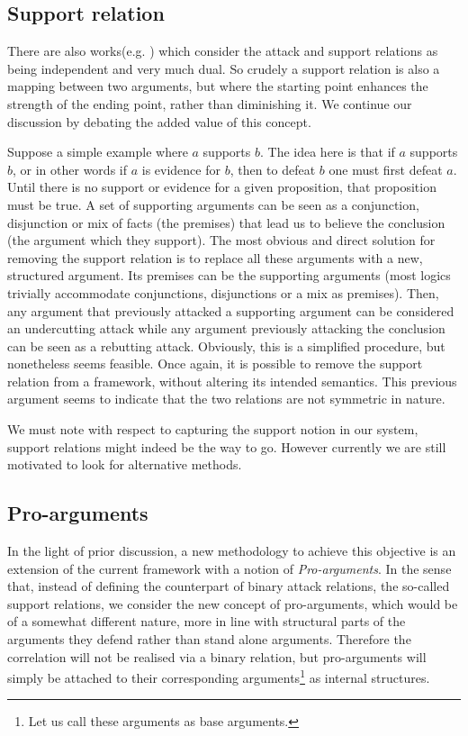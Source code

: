 \documentclass{article}
\begin{document}
\subsection{Support relation}
There are also works(e.g. \cite{4}) which consider the attack and support relations as being independent and very much dual. So crudely a support relation is also a mapping between two arguments, but where the starting point enhances the strength of the ending point, rather than diminishing it. We continue our discussion by debating the added value of this concept. 

 Suppose a simple example where $a$ supports $b$. The idea here is that if $a$ supports $b$, or in other words if $a$ is evidence for $b$, then to defeat $b$ one must first defeat $a$. Until there is no support or evidence for a given proposition, that proposition must be true. A set of supporting arguments can be seen as a conjunction, disjunction or mix of facts (the premises) that lead us to believe the conclusion (the argument which they support). The most obvious and direct solution for removing the support relation is to replace all these arguments with a new, structured argument. Its premises can be the supporting arguments (most logics trivially accommodate conjunctions, disjunctions or a mix as premises). Then, any argument that previously attacked a supporting argument can be considered an undercutting attack while any argument previously attacking the conclusion can be seen as a rebutting attack. Obviously, this is a simplified procedure, but nonetheless seems feasible. Once again, it is possible to remove the support relation from a framework, without altering its intended semantics. This previous argument seems to indicate that the two relations are not symmetric in nature. 

We must note with respect to capturing the support notion in our system, support relations might indeed be the way to go. However currently we are still motivated to look for alternative methods.

\subsection{Pro-arguments}
In the light of prior discussion, a new methodology to achieve this objective is an extension of the current framework with a notion of \emph{Pro-arguments}. In the sense that, instead of defining the counterpart of binary attack relations, the so-called support relations, we consider the new concept of pro-arguments,  which would be of a somewhat different nature, more in line with structural parts of the arguments they defend rather than stand alone arguments. Therefore the correlation will not be realised via a binary relation, but pro-arguments will simply be attached to their corresponding arguments\footnote{Let us call these arguments as base arguments.} as internal structures. 
\end{document}
